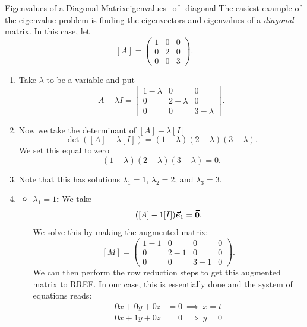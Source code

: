         \begin{ex}{Eigenvalues of a Diagonal Matrix}{eigenvalues_of_diagonal}
        The easiest example of the eigenvalue problem is finding the eigenvectors and eigenvalues of a \emph{diagonal} matrix.  In this case, let
        \[
        [A]=\begin{pmatrix}
        1 & 0 & 0\\
        0 & 2 & 0\\
        0 & 0 & 3
        \end{pmatrix}.
        \]
        \begin{enumerate}
            \item Take $\lambda$ to be a variable and put
            \[
            A-\lambda I = \begin{bmatrix}
            1-\lambda & 0 & 0\\
            0 & 2-\lambda & 0\\
            0 & 0 & 3-\lambda
            \end{bmatrix}.
            \]
        \item Now we take the determinant of $[A]-\lambda [I]$
        \[
        \det([A]-\lambda [I])= (1-\lambda)(2-\lambda)(3-\lambda).
        \]
        We set this equal to zero
        \[
        (1-\lambda)(2-\lambda)(3-\lambda)=0.
        \]
        \item Note that this has solutions $\lambda_1=1$, $\lambda_2=2$, and $\lambda_3=3$.  
        \item 
        \begin{itemize}
            \item \textbf{$\lambda_1=1$:} We take
            \[
            ([A]-1[I])\boldsymbol{\vec{e}}_1=\boldsymbol{\vec{0}}.
            \]
            We solve this by making the augmented matrix:
            \[
            [M]=\left( \begin{array}{ccc|c}
                 1-1 & 0 & 0 & 0\\
                 0 & 2-1 & 0 & 0\\
                 0 & 0 & 3-1 & 0
            \end{array}\right).
            \]
            We can then perform the row reduction steps to get this augmented matrix to RREF.  In our case, this is essentially done and the system of equations reads:
            \begin{align*}
                0x+0y+0z&=0 ~\implies~ x=t\\
                0x+1y+0z&=0 ~\implies~ y=0\\

\end{align*}
\end{itemize}
\end{enumerate}
\end{ex}

